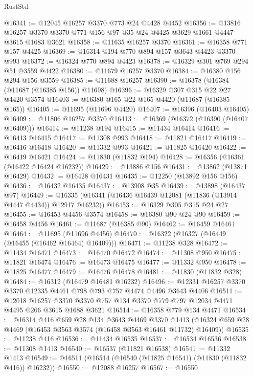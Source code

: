 \begin{lexlean}{RustStd}
\begin{coremodule}
@16341 := @12045 @16257 @3370 @773 @24 @4428 @4452
@16356 := @13816 @16257 @3370 @3370 @771 @156 @97 @35 @24 @4425 @3629 @1661 @4447 @3615 @1683 @3621
@16358 := @11635 @16257 @3370
@16361 := @16358 @771 @157 @4425
@16369 := @16314 @194 @770 @894 @157 @3643 @4423 @3370 @993
@16372 := @16324 @770 @894 @4423
@16378 := @16329 @301 @769 @294 @51 @3559 @4422
@16380 := @11679 @16257 @3370
@16384 := @16380 @156 @294 @156 @3559
@16385 := @11688 @16257
@16390 := @16378 (@16384 (@11687 (@16385 @156)) @11698)
@16396 := @16329 @307 @315 @22 @27 @4420 @3574
@16403 := @16380 @165 @22 @165 @4420 (@11687 (@16385 @165))
@16405 := @11695 (@11696 @4420)
@16407 := @16396 (@16403 @16405)
@16409 := @11806 @16257 @3370
@16413 := @16369 (@16372 (@16390 (@16407 @16409)))
@16414 := @11238 @194
@16415 := @11434 @16414
@16416 := @16413 @16415
@16417 := @11308 @993
@16418 := @11821 @16417
@16419 := @16416 @16418
@16420 := @11332 @993
@16421 := @11825 @16420
@16422 := @16419 @16421
@16424 := @11830 (@11832 @194)
@16428 := @16356 (@16361 (@16422 @16424 @16232))
@16429 := @13886 @156
@16431 := @13862 (@13871 @16429)
@16432 := @16428 @16431
@16435 := @12250 (@13892 @156 @156)
@16436 := @16432 @16435
@16437 := @13908 @35
@16439 := @13898 (@16437 @97)
@16449 := @16335 (@16341 (@16436 @16439 @12081 (@11836 (@13914 @4447 @4434)) @12917 @16232))
@16453 := @16329 @305 @315 @24 @27
@16455 := @16453 @4456 @3574
@16458 := @16380 @90 @24 @90
@16459 := @16458 @4456
@16461 := @11687 (@16385 @90)
@16462 := @16459 @16461
@16464 := @11695 (@11696 @4456)
@16470 := @16322 (@16327 (@16449 (@16455 (@16462 @16464) @16409)))
@16471 := @11238 @328
@16472 := @11434 @16471
@16473 := @16470 @16472
@16474 := @11308 @950
@16475 := @11821 @16474
@16476 := @16473 @16475
@16477 := @11332 @950
@16478 := @11825 @16477
@16479 := @16476 @16478
@16481 := @11830 (@11832 @328)
@16484 := @16312 (@16479 @16481 @16232)
@16496 := @12331 @16257 @3370 @3370 @12335 @4461 @798 @793 @757 @4474 @4496 @3643 @4406
@16511 := @12018
    @16257
    @3370
    @3370
    @757
    @134
    @3370
    @779
    @797
    @12034
    @4471
    @4495
    @266
    @3615
    @1688
    @3621
@16514 := @16358 @779 @134 @4471
@16534 := @16314
    @416
    @659
    @28
    @134
    @3643
    @4469
    @3370
    @1413
    (@16324 @659 @28 @4469 (@16453 @3563 @3574 (@16458 @3563 @16461 @11732) @16409))
@16535 := @11238 @416
@16536 := @11434 @16535
@16537 := @16534 @16536
@16538 := @11308 @1413
@16540 := @16537 (@11821 @16538)
@16541 := @11332 @1413
@16549 := @16511 (@16514 (@16540 (@11825 @16541) (@11830 (@11832 @416)) @16232))
@16550 := @12088 @16257
@16567 := @16550

\end{coremodule}
\end{lexlean}
